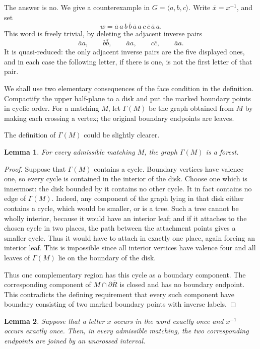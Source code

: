 \documentclass[12pt]{article}
\newtheorem{lemma}{Lemma}
\newcommand{\ol}{\overline}
\newcommand{\review}[1]{\begin{reviewbox}#1\end{reviewbox}}
\begin{document}
The answer is no.  We give a counterexample in
\(G=\langle a,b,c\rangle\).  Write \(\ol x=x^{-1}\), and set
\[
        w=\ol a\,a\, b\,\ol b\,\ol a\,a\, c\,\ol c\,\ol a\,a .
\]
This word is freely trivial, by deleting the adjacent inverse pairs
\[
        \ol a a,\qquad b\ol b,\qquad \ol a a,\qquad c\ol c,\qquad
        \ol a a .
\]
It is quasi-reduced: the only adjacent inverse pairs are the five
displayed ones, and in each case the following letter, if there is one,
is not the first letter of that pair.

We shall use two elementary consequences of the face condition in the
definition.  Compactify the upper half-plane to a disk and put the
marked boundary points in cyclic order.  For a matching \(M\), let
\(\Gamma(M)\) be the graph obtained from \(M\) by making each crossing a
vertex; the original boundary endpoints are leaves.

\review{The definition of $\Gamma(M)$ could be slightly clearer.}

\begin{lemma}
For every admissible matching \(M\), the graph \(\Gamma(M)\) is a
forest.
\end{lemma}

\begin{proof}
Suppose that \(\Gamma(M)\) contains a cycle.  Boundary vertices have
valence one, so every cycle is contained in the interior of the disk.
Choose one which is innermost: the disk bounded by it contains no other
cycle.  It in fact contains no edge of \(\Gamma(M)\).  Indeed, any
component of the graph lying in that disk either contains a cycle, which
would be smaller, or is a tree.  Such a tree cannot be wholly interior,
because it would have an interior leaf; and if it attaches to the chosen
cycle in two places, the path between the attachment points gives a
smaller cycle.  Thus it would have to attach in exactly one place, again
forcing an interior leaf.  This is impossible since all interior vertices
have valence four and all leaves of \(\Gamma(M)\) lie on the boundary of
the disk.

Thus one complementary region has this cycle as a boundary component.
The corresponding component of
\(M\cap\partial\overline R\) is closed and has no boundary endpoint.
This contradicts the defining requirement that every such component
have boundary consisting of two marked boundary points with inverse
labels.
\end{proof}

\begin{lemma}
Suppose that a letter \(x\) occurs in the word exactly once and
\(x^{-1}\) occurs exactly once.  Then, in every admissible matching, the
two corresponding endpoints are joined by an uncrossed interval.
\end{lemma}
\end{document}
